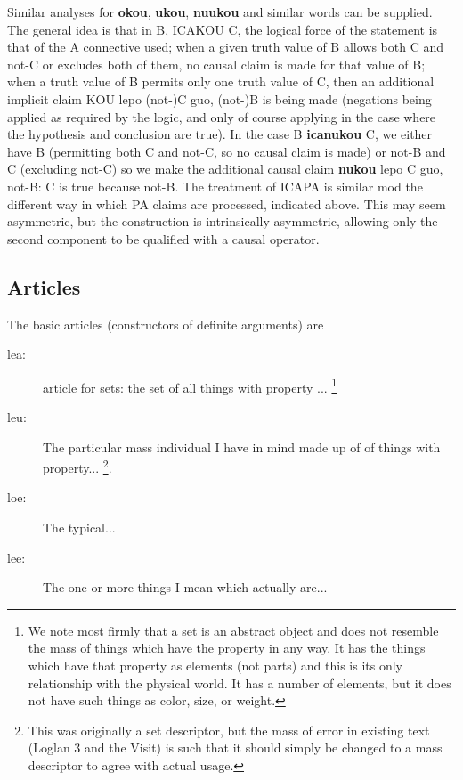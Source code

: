 \documentclass[12pt]{book}
\begin{document}
{Similar analyses for {\bf okou}, {\bf ukou}, {\bf nuukou} and similar words can be supplied.  The general idea is that in B, ICAKOU C, the logical force of the statement is that of the A connective used;  when a given truth value of B allows both C and not-C or excludes both of them, no causal claim is made for that value of B;  when a truth value of B permits only one truth value of C, then an additional implicit claim KOU lepo (not-)C guo, (not-)B is being made (negations being applied as required by the logic, and only of course applying in the case where the hypothesis and conclusion are true).  In the case B {\bf icanukou} C, we either have B (permitting both C and not-C, so no causal claim is made) or not-B and C (excluding not-C) so we make the additional causal claim {\bf nukou} lepo C guo, not-B:  C is true because not-B.  The treatment of ICAPA is similar mod the different way in which PA claims are processed, indicated above.
This may seem asymmetric, but the construction is intrinsically asymmetric, allowing only the second component to be qualified with a causal operator.

\subsection{Articles}

The basic articles (constructors of definite arguments) are 

\begin{description}
\item[lea:]  article for sets:  the set of all things with property ... \footnote{We note most firmly that a set is an abstract object and does not resemble the mass of things which have the property in any way.  It has the things which have that property as elements (not parts) and this is its only relationship with the physical world.   It has a number of elements, but it does not have such things as color, size, or weight.}

 \item[leu:]   The particular mass individual I have in mind made up of of things with property... 
 \footnote{This was originally a set descriptor, but the mass of error in existing text (Loglan 3 and the Visit) is such that it should simply be changed to a mass descriptor to agree with actual usage.}.

 \item[loe:]  The typical...

 \item[lee:]   The one or more things I mean which actually are...


\end{description}}
\end{document}
